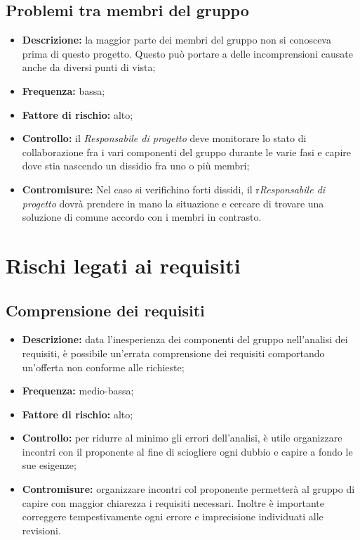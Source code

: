 \documentclass[./PianodiProgetto.tex]{subfiles}
\begin{document}
	\subsection{Problemi tra membri del gruppo}
	\begin{itemize}
		\item \textbf{Descrizione:} la maggior parte dei membri del gruppo non si conosceva prima di questo progetto. Questo può portare a delle incomprensioni causate anche da diversi punti di vista;
		\item \textbf{Frequenza:} bassa;
		\item \textbf{Fattore di rischio:} alto;
		\item \textbf{Controllo:} il \textit{Responsabile di progetto} deve monitorare lo stato di collaborazione fra i vari componenti del gruppo durante le varie fasi e capire dove stia nascendo un dissidio fra uno o più membri;
		\item \textbf{Contromisure:} Nel caso si verifichino forti dissidi, il r\textit{Responsabile di progetto} dovrà prendere in mano la situazione e cercare di trovare una soluzione di comune accordo con i membri in contrasto. 
	\end{itemize}
	
	\section{Rischi legati ai requisiti}
	\subsection{Comprensione dei requisiti}
	\begin{itemize}
		\item \textbf{Descrizione:} data l'inesperienza dei componenti del gruppo nell'analisi dei requisiti, è possibile un'errata comprensione dei requisiti comportando un'offerta non conforme alle richieste;
		\item \textbf{Frequenza:} medio-bassa;
		\item \textbf{Fattore di rischio:} alto;
		\item \textbf{Controllo:} per ridurre al minimo gli errori dell'analisi, è utile organizzare incontri con il proponente al fine di sciogliere ogni dubbio e capire a fondo le sue esigenze;
		\item \textbf{Contromisure:} organizzare incontri col proponente permetterà al gruppo di capire con maggior chiarezza i requisiti necessari. Inoltre è importante correggere tempestivamente ogni errore e imprecisione individuati alle revisioni. 
	\end{itemize}
	
\end{document}
